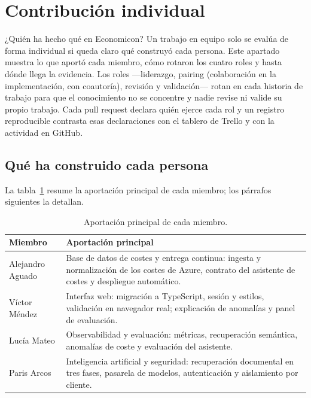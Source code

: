 \section{Contribución individual}\label{c-0}

¿Quién ha hecho qué en Economicon? Un trabajo en equipo solo se evalúa de forma individual si queda claro qué construyó cada persona. Este apartado muestra lo que aportó cada miembro, cómo rotaron los cuatro roles y hasta dónde llega la evidencia. Los roles ---liderazgo, pairing (colaboración en la implementación, con coautoría), revisión y validación--- rotan en cada historia de trabajo para que el conocimiento no se concentre y nadie revise ni valide su propio trabajo. Cada pull request declara quién ejerce cada rol y un registro reproducible contrasta esas declaraciones con el tablero de Trello y con la actividad en GitHub. \cite{gobierno}

\subsection{Qué ha construido cada persona}\label{c-1}

La tabla~\ref{tab-c1} resume la aportación principal de cada miembro; los párrafos siguientes la detallan.

\begin{table}[htbp]
\centering\small
\caption{Aportación principal de cada miembro.}\label{tab-c1}
\begin{tabular}{@{}>{\raggedright\arraybackslash}p{}>{\raggedright\arraybackslash}p{}@{}}
\toprule
\textbf{Miembro} & \textbf{Aportación principal} \\
\midrule
Alejandro Aguado & Base de datos de costes y entrega continua: ingesta y normalización de los costes de Azure, contrato del asistente de costes y despliegue automático. \\
Víctor Méndez & Interfaz web: migración a TypeScript, sesión y estilos, validación en navegador real; explicación de anomalías y panel de evaluación. \\
Lucía Mateo & Observabilidad y evaluación: métricas, recuperación semántica, anomalías de coste y evaluación del asistente. \\
Paris Arcos & Inteligencia artificial y seguridad: recuperación documental en tres fases, pasarela de modelos, autenticación y aislamiento por cliente. \\
\bottomrule
\end{tabular}
\end{table}

